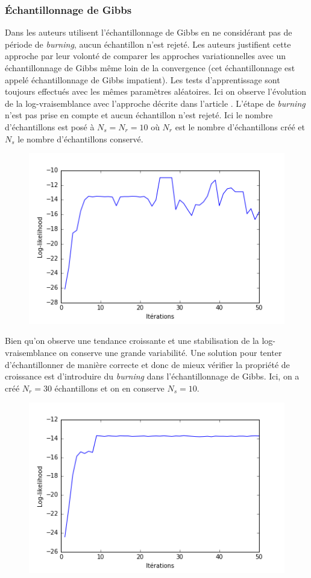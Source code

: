 \documentclass[10pt,a4paper]{article}
\begin{document}
\subsubsection{Échantillonnage de Gibbs}
Dans \cite{ghahramani1997factorial} les auteurs utilisent l'échantillonnage de 
Gibbs en ne considérant pas de période de \textit{burning}, aucun échantillon 
n'est rejeté. Les auteurs justifient cette approche par leur volonté de 
comparer les approches variationnelles avec un échantillonnage de Gibbs même 
loin de la convergence (cet échantillonnage est appelé échantillonnage de Gibbs 
impatient). Les tests d'apprentissage sont toujours effectués avec les mêmes 
paramètres aléatoires. Ici on observe l'évolution de la log-vraisemblance avec 
l'approche décrite dans l'article \cite{ghahramani1997factorial}. L'étape de 
\textit{burning} n'est pas prise en compte et aucun échantillon n'est rejeté. 
Ici le nombre d'échantillons est posé à $N_s=N_r=10$ où $N_r$ est le nombre 
d'échantillons créé et $N_s$ le nombre d'échantillons conservé.
\begin{figure}[H]
\centering
\includegraphics[scale=0.5]{../resources/pictures/M3_K2_gibbsnoburning.png}
\end{figure}
Bien qu'on observe une tendance croissante et une stabilisation de la 
log-vraisemblance on conserve une grande variabilité. Une solution pour tenter 
d'échantillonner de manière correcte et donc de mieux vérifier la propriété de 
croissance est d'introduire du \textit{burning} dans l'échantillonnage de 
Gibbs. Ici, on a créé $N_r = 30$ échantillons et on en conserve $N_s = 10$.
\begin{figure}[H]
\centering
\includegraphics[scale=0.5]{../resources/pictures/M3_K2_gibbs.png}
\end{figure}
\end{document}
